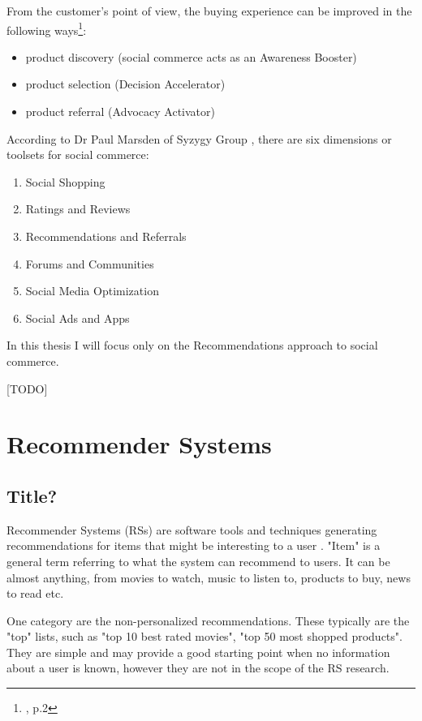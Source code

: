 \documentclass[12pt]{report}
\begin{document}
From the customer's point of view, the buying experience can be improved in the following ways\footnote{\cite{social_commerce_syzygy}, p.2}:
\begin{itemize}
\item product discovery (social commerce acts as an Awareness Booster)
\item product selection (Decision Accelerator)
\item product referral (Advocacy Activator)
\end{itemize}

According to Dr Paul Marsden of Syzygy Group \cite{social_commerce_syzygy}, there are six dimensions or toolsets for social commerce:
\begin{enumerate}
\item Social Shopping
\item Ratings and Reviews
\item Recommendations and Referrals
\item Forums and Communities
\item Social Media Optimization
\item Social Ads and Apps
\end{enumerate}

In this thesis I will focus only on the Recommendations approach to social commerce.

[TODO]

\section{Recommender Systems}

\subsection{Title?}

Recommender Systems (RSs) are software tools and techniques generating recommendations for items that might be interesting to a user \cite{rec_sys_handbook}. "Item" is a general term referring to what the system can recommend to users. It can be almost anything, from movies to watch, music to listen to, products to buy, news to read etc.

One category are the non-personalized recommendations. These typically are the "top" lists, such as "top 10 best rated movies", "top 50 most shopped products". They are simple and may provide a good starting point when no information about a user is known, however they are not in the scope of the RS research.
\end{document}
